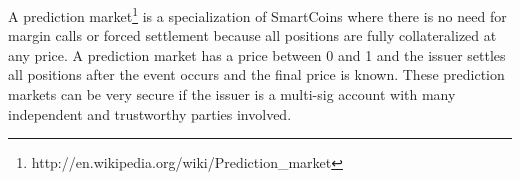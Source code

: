 A prediction market\footnote{http://en.wikipedia.org/wiki/Prediction\_market} is
a specialization of SmartCoins where there is no need for margin calls or
forced settlement because all positions are fully collateralized at any price.
A prediction market has a price between 0 and 1 and the issuer settles all
positions after the event occurs and the final price is known. These
prediction markets can be very secure if the issuer is a multi-sig account with
many independent and trustworthy parties involved.
